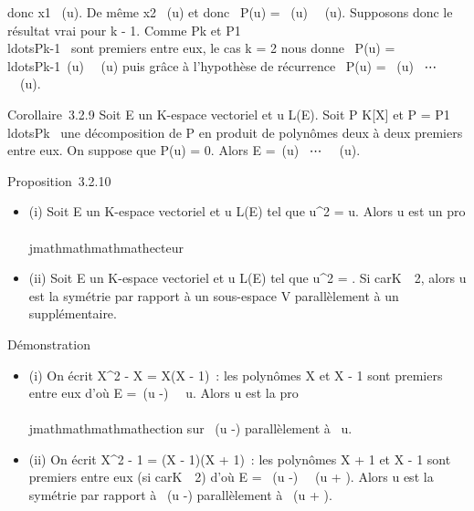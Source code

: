 donc x1
\in{}~(u).
De même x2
\in{}~(u)
et donc \mathrmKer~P(u)
= ~(u)
\oplus~~(u).
Supposons donc le résultat vrai pour k - 1. Comme Pk et
P1\\ldotsPk-1~
sont premiers entre eux, le cas k = 2 nous donne
\mathrmKer~P(u)
=\
\\ldotsPk-1~(u)
\oplus~\mathrmKerPk~(u)
puis grâce à l'hypothèse de récurrence
\mathrmKer~P(u)
= ~(u)
\oplus~⋯
\oplus~\mathrmKerPk~(u).

Corollaire~3.2.9 Soit E un K-espace vectoriel et u \in L(E). Soit P \in
K{[}X{]} et P =
P1\\ldotsPk~
une décomposition de P en produit de polynômes deux à deux premiers
entre eux. On suppose que P(u) = 0. Alors E =\
\mathrmKerP1(u)
\oplus~⋯
\oplus~\mathrmKerPk~(u).

Proposition~3.2.10

\begin{itemize}
\itemsep1pt\parskip0pt
\item
  (i) Soit E un K-espace vectoriel et u \in L(E) tel que u^2 =
  u. Alors u est un pro\\\\jmathmathmathmathecteur
\item
  (ii) Soit E un K-espace vectoriel et u \in L(E) tel que u^2 =
  \mathrmId. Si
  carK\mathrel\neq~~2, alors u
  est la symétrie par rapport à un sous-espace V parallèlement à un
  supplémentaire.
\end{itemize}

Démonstration

\begin{itemize}
\itemsep1pt\parskip0pt
\item
  (i) On écrit X^2 - X = X(X - 1)~: les polynômes X et X - 1
  sont premiers entre eux d'où E =\
  \mathrmKer(u -\mathrmId)
  \oplus~\mathrmKer~u. Alors u est
  la pro\\\\jmathmathmathmathection sur
  \mathrmKer~(u
  -\mathrmId) parallèlement à
  \mathrmKer~u.
\item
  (ii) On écrit X^2 - 1 = (X - 1)(X + 1)~: les polynômes X +
  1 et X - 1 sont premiers entre eux (si
  carK\mathrel\neq~~2) d'où E
  = \mathrmKer~(u
  -\mathrmId)
  \oplus~\mathrmKer~(u +
  \mathrmId). Alors u est la symétrie par rapport à
  \mathrmKer~(u
  -\mathrmId) parallèlement à
  \mathrmKer~(u +
  \mathrmId).
\end{itemize}

